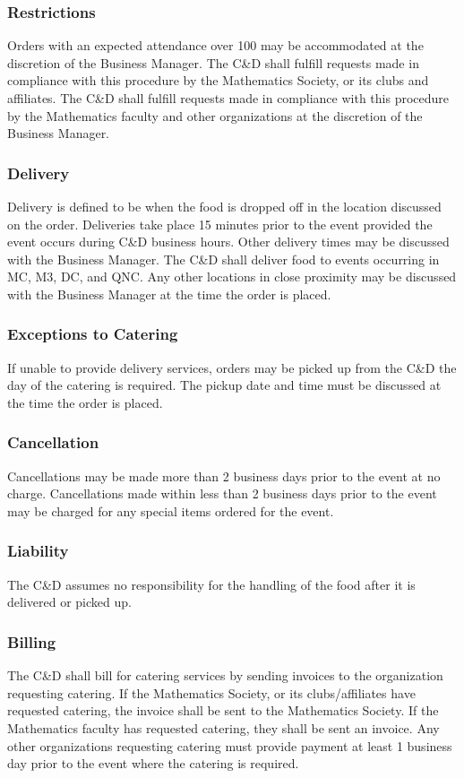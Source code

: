 \subsubsection{Restrictions}
Orders with an expected attendance over 100 may be accommodated at the discretion of the Business Manager.
The C\&D shall fulfill requests made in compliance with this procedure by the Mathematics Society, or its clubs and affiliates. 
The C\&D shall fulfill requests made in compliance with this procedure by the Mathematics faculty and other organizations at the discretion of the Business Manager.

\subsubsection{Delivery}
Delivery is defined to be when the food is dropped off in the location discussed on the order.
Deliveries take place 15 minutes prior to the event provided the event occurs during C\&D business hours. 
Other delivery times may be discussed with the Business Manager.
The C\&D shall deliver food to events occurring in MC, M3, DC, and QNC.
Any other locations in close proximity may be discussed with the Business Manager at the time the order is placed.

\subsubsection{Exceptions to Catering}
If unable to provide delivery services, orders may be picked up from the C\&D the day of the catering is required. 
The pickup date and time must be discussed at the time the order is placed.

\subsubsection{Cancellation}
Cancellations may be made more than 2 business days prior to the event at no charge.
Cancellations made within less than 2 business days prior to the event may be charged for any special items ordered for the event.

\subsubsection{Liability}
The C\&D assumes no responsibility for the handling of the food after it is delivered or picked up.

\subsubsection{Billing}
The C\&D shall bill for catering services by sending invoices to the organization requesting catering.
If the Mathematics Society, or its clubs/affiliates have requested catering, the invoice shall be sent to the Mathematics Society.
If the Mathematics faculty has requested catering, they shall be sent an invoice.
Any other organizations requesting catering must provide payment at least 1 business day prior to the event where the catering is required.




